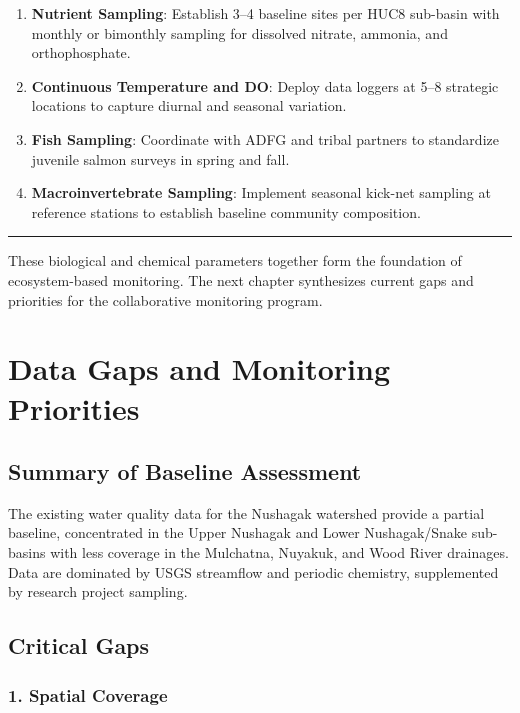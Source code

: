 \documentclass[
  letterpaper,
]{scrbook}
\begin{document}
\begin{enumerate}
\def\labelenumi{\arabic{enumi}.}
\item
  \textbf{Nutrient Sampling}: Establish 3--4 baseline sites per HUC8
  sub-basin with monthly or bimonthly sampling for dissolved nitrate,
  ammonia, and orthophosphate.
\item
  \textbf{Continuous Temperature and DO}: Deploy data loggers at 5--8
  strategic locations to capture diurnal and seasonal variation.
\item
  \textbf{Fish Sampling}: Coordinate with ADFG and tribal partners to
  standardize juvenile salmon surveys in spring and fall.
\item
  \textbf{Macroinvertebrate Sampling}: Implement seasonal kick-net
  sampling at reference stations to establish baseline community
  composition.
\end{enumerate}

\begin{center}\rule{0.5\linewidth}{0.5pt}\end{center}

These biological and chemical parameters together form the foundation of
ecosystem-based monitoring. The next chapter synthesizes current gaps
and priorities for the collaborative monitoring program.

\chapter{Data Gaps and Monitoring
Priorities}\label{data-gaps-and-monitoring-priorities}

\section{Summary of Baseline
Assessment}\label{summary-of-baseline-assessment}

The existing water quality data for the Nushagak watershed provide a
partial baseline, concentrated in the Upper Nushagak and Lower
Nushagak/Snake sub-basins with less coverage in the Mulchatna, Nuyakuk,
and Wood River drainages. Data are dominated by USGS streamflow and
periodic chemistry, supplemented by research project sampling.

\section{Critical Gaps}\label{critical-gaps}

\subsection{1. Spatial Coverage}\label{spatial-coverage}
\end{document}
